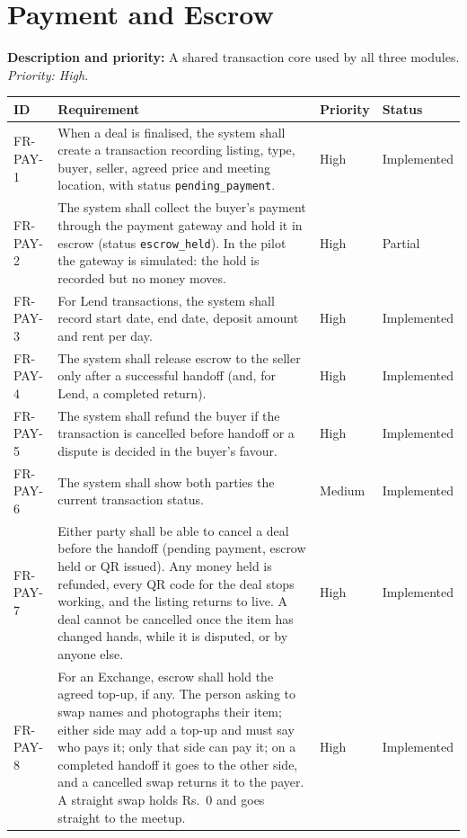 \documentclass[11pt,a4paper]{scrreprt}
\newenvironment{reqtable}{%
  \small
  \begin{longtable}{>{\raggedright\arraybackslash\ttfamily\footnotesize}p{2.05cm} L{8.85cm} L{1.45cm} L{2.05cm}}
  \toprule
  \normalfont\normalsize\textbf{ID} & \textbf{Requirement} & \textbf{Priority} & \textbf{Status}\\
  \midrule\endhead
  \bottomrule\endfoot
}{\end{longtable}}
\newcommand{\impl}{Implemented}
\newcommand{\partl}{Partial}
\begin{document}
\section{Payment and Escrow}
\textbf{Description and priority:} A shared transaction core used by all
three modules. \emph{Priority: High.}

\begin{reqtable}
FR-PAY-1 & When a deal is finalised, the system shall create a transaction recording listing, type, buyer, seller, agreed price and meeting location, with status \texttt{pending_payment}. & High & \impl\\
FR-PAY-2 & The system shall collect the buyer's payment through the payment gateway and hold it in escrow (status \texttt{escrow_held}). In the pilot the gateway is simulated: the hold is recorded but no money moves. & High & \partl\\
FR-PAY-3 & For Lend transactions, the system shall record start date, end date, deposit amount and rent per day. & High & \impl\\
FR-PAY-4 & The system shall release escrow to the seller only after a successful handoff (and, for Lend, a completed return). & High & \impl\\
FR-PAY-5 & The system shall refund the buyer if the transaction is cancelled before handoff or a dispute is decided in the buyer's favour. & High & \impl\\
FR-PAY-6 & The system shall show both parties the current transaction status. & Medium & \impl\\
FR-PAY-7 & Either party shall be able to cancel a deal before the handoff (pending payment, escrow held or QR issued). Any money held is refunded, every QR code for the deal stops working, and the listing returns to live. A deal cannot be cancelled once the item has changed hands, while it is disputed, or by anyone else. & High & \impl\\
FR-PAY-8 & For an Exchange, escrow shall hold the agreed top-up, if any. The person asking to swap names and photographs their item; either side may add a top-up and must say who pays it; only that side can pay it; on a completed handoff it goes to the other side, and a cancelled swap returns it to the payer. A straight swap holds Rs.~0 and goes straight to the meetup. & High & \impl\\
\end{reqtable}

\end{document}
